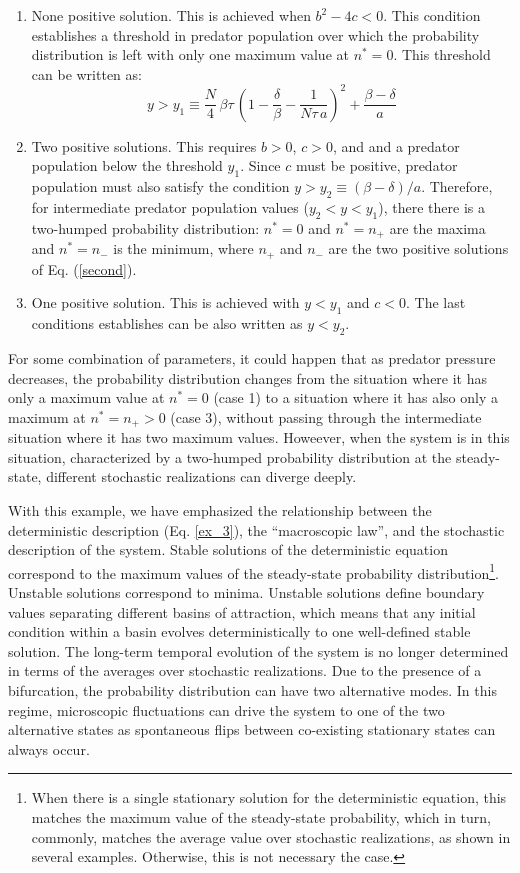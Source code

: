 \begin{enumerate}
\item None positive solution. This is achieved when $b^2 - 4c<0$. This condition establishes a threshold in predator population over which the probability distribution is left with only one maximum value at $n^{*}=0$. This threshold can be written as: 
\begin{equation}
y > y_{1} \equiv \frac{N}{4}\,\beta\tau\,\left(1-\frac{\delta}{\beta}-\frac{1}{N\tau\,a}\right)^2 + \frac{\beta-\delta}{a}
\end{equation}   
\item Two positive solutions. This requires $b>0$, $c>0$, and and a predator population below the threshold $y_{1}$. Since $c$ must be positive, predator population must also satisfy the condition $y > y_{2} \equiv (\beta-\delta)/a$. Therefore, for intermediate predator population values ($y_{2}<y<y_{1}$), there there is a two-humped probability distribution: $n^{*}=0$ and $n^{*}=n_{+}$ are the maxima and $n^{*}=n_{-}$ is the minimum, where $n_{+}$ and $n_{-}$ are the two positive solutions of Eq. (\ref{second}).  
\item One positive solution. This is achieved with $y<y_{1}$ and $c<0$. The last conditions establishes can be also written as $y<y_{2}$. 
\end{enumerate}
For some combination of parameters, it could happen that as predator pressure decreases, the probability distribution changes from the situation where it has only a maximum value at $n^{*}=0$ (case 1) to a situation where it has also only a maximum at $n^{*}=n_{+}>0$ (case 3), without passing through the intermediate situation where it has two maximum values. Howeever, when the system is in this situation, characterized by a two-humped probability distribution at the steady-state, different stochastic realizations can diverge deeply.
\smallskip 
 
With this example, we have emphasized the relationship between the deterministic description (Eq. \ref{ex_3}), the ``macroscopic law'', and the stochastic description of the system. Stable solutions of the deterministic equation correspond to the maximum values of the steady-state probability distribution\footnote{When there is a single stationary solution for the deterministic equation, this matches the maximum value of the steady-state probability, which in turn, commonly, matches the average value over stochastic realizations, as shown in several examples. Otherwise, this is not necessary the case.}. Unstable solutions correspond to minima. Unstable solutions define boundary values separating different basins of attraction, which means that any initial condition within a basin evolves deterministically to one well-defined stable solution. The long-term temporal evolution of the system is no longer determined in terms of the averages over stochastic realizations. Due to the presence of a bifurcation, the probability distribution can have two alternative modes. In this regime, microscopic fluctuations can drive the system to one of the two alternative states as spontaneous flips between co-existing stationary states can always occur. 


